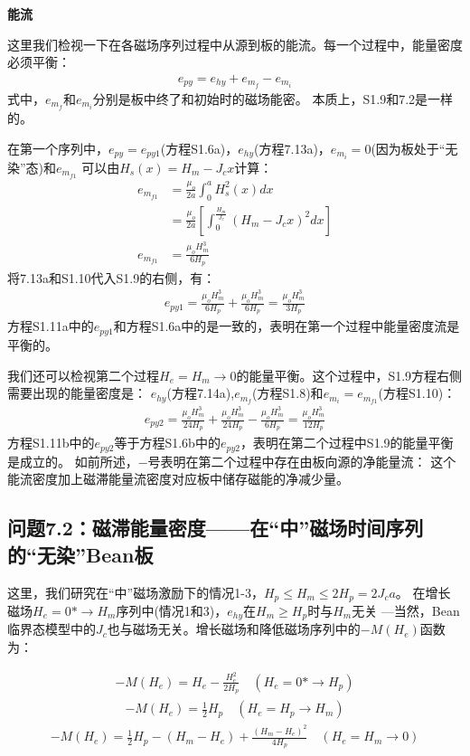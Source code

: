 \textbf{能流}

这里我们检视一下在各磁场序列过程中从源到板的能流。每一个过程中，能量密度必须平衡：
\begin{align*}%
e_{py}=e_{hy}+e_{m_f}-e_{m_i} \tag{S1.9}
\end{align*}
式中，$e_{m_f}$和$e_{m_i}$分别是板中终了和初始时的磁场能密。
本质上，S1.9和7.2是一样的。

在第一个序列中，$e_{py}=e_{py1}$(方程S1.6a)，$e_{hy}$(方程7.13a)，$e_{m_i}=0$(因为板处于“无染”态)和$e_{m_{f1}}$
可以由$H_s(x)=H_m-J_c x$计算：
\begin{align*}%
e_{m_{f1}}&=\frac{\mu_o}{2a}\int_{0}^{a}H_{s}^{2}(x)dx \\
&=\frac{\mu_o}{2a}\left[\int_{0}^{\frac{H_m}{J_c}}(H_m-J_cx)^2dx\right]\\
e_{m_{f1}}&=\frac{\mu_oH_{m}^{3}}{6H_p} \tag{S1.10}
\end{align*}
将7.13a和S1.10代入S1.9的右侧，有：
\begin{align*}%
e_{py1}=\frac{\mu_oH_{m}^{3}}{6H_p}+\frac{\mu_oH_{m}^{3}}{6H_p}=\frac{\mu_oH_{m}^{3}}{3H_p} \tag{S1.11a}
\end{align*}
方程S1.11a中的$e_{py1}$和方程S1.6a中的是一致的，表明在第一个过程中能量密度流是平衡的。

我们还可以检视第二个过程$H_e=H_m\rightarrow 0$的能量平衡。这个过程中，S1.9方程右侧需要出现的能量密度是：
$e_{hy}$(方程7.14a),$e_{m_f}$(方程S1.8)和$e_{m_i}=e_{m_{f1}}$(方程S1.10)：
\begin{align*}%
e_{py2}=\frac{\mu_oH_{m}^{3}}{24H_p}+\frac{\mu_oH_{m}^{3}}{24H_p}-\frac{\mu_oH_{m}^{3}}{6H_p}=\frac{\mu_oH_{m}^{3}}{12H_p} \tag{S1.11b}
\end{align*}
方程S1.11b中的$e_{py2}$等于方程S1.6b中的$e_{py2}$，表明在第二个过程中S1.9的能量平衡是成立的。
如前所述，$-$号表明在第二个过程中存在由板向源的净能量流：
这个能流密度加上磁滞能量流密度对应板中储存磁能的净减少量。


\subsection{问题7.2：磁滞能量密度——在“中”磁场时间序列的“无染”Bean板}
这里，我们研究在“中”磁场激励下的情况1-3，$H_p\le H_m\le2H_p=2J_c a$。
在增长磁场$H_e=0*\rightarrow H_m$序列中(情况1和3)，$e_{hy}$在$H_m\ge H_p$时与$H_m$无关
---当然，Bean临界态模型中的$J_c$也与磁场无关。增长磁场和降低磁场序列中的$−M(H_e)$函数为：

\begin{align*}%
-M(H_e)=H_e-\frac{H_{e}^{2}}{2H_p}    \quad  (H_e=0*\rightarrow H_p) \tag{5.5}
\end{align*}
\begin{align*}
-M(H_e)=\frac{1}{2}H_p      \quad  (H_e=H_p\rightarrow H_m) \tag{5.6}
\end{align*}
\begin{align*}
-M(H_e)=\frac{1}{2}H_p-(H_m-H_e)+\frac{(H_m-H_e)^2}{4H_p} \quad   (H_e=H_m\rightarrow 0)\tag{5.7a}
\end{align*}

